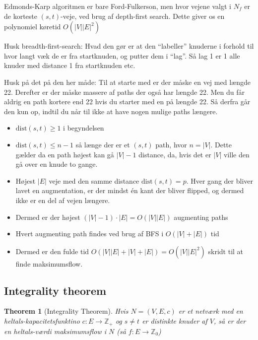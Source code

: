 \documentclass[11pt]{article}
\newtheorem{theorem}{Theorem}
\theoremstyle{definition}
\theoremstyle{remark}
\begin{document}
Edmonds-Karp algoritmen er bare Ford-Fulkerson, men hvor vejene valgt i $N_{f}$ er de korteste $(s,t)$-veje, ved brug af depth-first search. Dette giver os en polynomiel køretid $O(|V||E|^{2})$

Husk breadth-first-search: Hvad den gør er at den ``labeller'' knuderne i forhold til hvor langt væk de er fra startknuden, og putter dem i ``lag''. Så lag 1 er 1 alle knuder med distance 1 fra startknuden etc.

Husk på det på den her måde: Til at starte med er der måske en vej med længde 22. Derefter er der måske massere af paths der også har længde 22. Men du får aldrig en path kortere end 22 hvis du starter med en på længde 22. Så derfra går den kun op, indtil du når til ikke at have nogen mulige paths længere. 


\begin{itemize}
\item $\text{dist}(s,t) \geq 1$ i begyndelsen
\item $\text{dist}(s,t) \leq n-1$ så længe der er et $(s,t)$ path, hvor $n = |V|$. Dette gælder da en path højest kan gå $|V| - 1 $ distance, da, hvis det er $|V|$ ville den gå over en knude to gange.
\item Højest $|E|$ veje med den samme distance $\text{dist}(s,t) = p$. Hver gang der bliver lavet en augmentation, er der mindst én kant der bliver flipped, og dermed ikke er en del af vejen længere. 
\item Dermed er der højest $(|V|-1) \cdot |E| = O(|V||E|)$ augmenting paths
\item Hvert augmenting path findes ved brug af BFS i $O(|V|+|E|)$ tid
\item Dermed er den fulde tid $O(|V||E| + |V|+|E|) = O(|V||E|^{2})$ skridt til at finde maksimumsflow.
\end{itemize}



\subsection{Integrality theorem}
\label{subsec:label}

\begin{theorem}[Integrality Theorem]
Hvis $N = (V,E,c)$ er et netværk med en heltals-kapacitetsfunktino $c : E \rightarrow \mathbb{Z_{+}}$ og $s \neq t$ er distinkte knuder af $V$, så er der en heltals-værdi maksimumsflow i $N$ (så $f : E \rightarrow \mathbb{Z}_{0}$)
\end{theorem}
\end{document}
